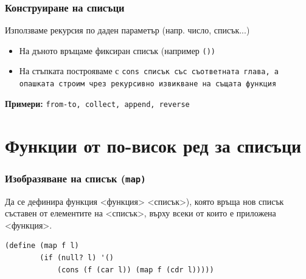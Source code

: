 \documentclass[alsotrans,beameroptions={aspectratio=169}]{beamerswitch}
\begin{document}
\begin{frame}
  \frametitle{Конструиране на списъци}

  Използваме рекурсия по даден параметър (напр. число, списък...)
  \begin{itemize}
  \item На дъното връщаме фиксиран списък (например \tt{()})
  \item На стъпката построяваме с \tt{cons} списък със съответната глава, а опашката строим чрез рекурсивно извикване на същата функция
  \end{itemize}
  \pause
  \vspace{4ex}
  \textbf{Примери:} \tt{from-to}, \tt{collect}, \tt{append}, \tt{reverse}
\end{frame}

\section{Функции от по-висок ред за списъци}

\begin{frame}[label=map,fragile]
  \frametitle{Изобразяване на списък (\tt{map})}

  Да се дефинира функция  <функция> <списък>\tta), която връща нов списък съставен от елементите на <списък>, върху всеки от които е приложена <функция>.\\
  \pause
  \begin{center}
  \end{center}
  \pause
\begin{lstlisting}
(define (map f l)
        (if (null? l) '()
            (cons (f (car l)) (map f (cdr l)))))
\end{lstlisting}
\end{frame}
\end{document}
